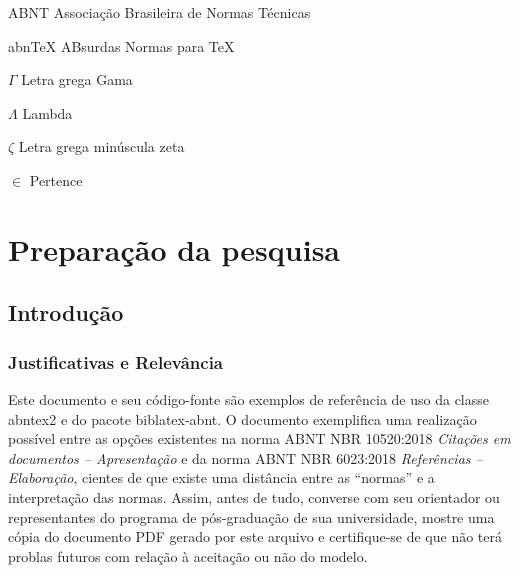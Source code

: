 \documentclass[
	12pt,				%
	openright,			%
	twoside,			%
	a4paper,			%
	english,			%
	brazil				%
	]{abntex2}
\begin{document}
\listoftables*
\cleardoublepage

\begin{siglas}
  \item[ABNT] Associação Brasileira de Normas Técnicas
  \item[abnTeX] ABsurdas Normas para TeX
\end{siglas}

\begin{simbolos}
  \item[$ \Gamma $] Letra grega Gama
  \item[$ \Lambda $] Lambda
  \item[$ \zeta $] Letra grega minúscula zeta
  \item[$ \in $] Pertence
\end{simbolos}

\tableofcontents*
\cleardoublepage
\makeatletter
{}
\makeatother



\textual
\part{Preparação da pesquisa}
%
\chapter[Introdução]{Introdução}

\section{Justificativas e Relevância}
%
Este documento e seu código-fonte são exemplos de referência de uso da classe \textsf{abntex2} e do pacote \textsf{biblatex-abnt}. O documento exemplifica uma realização possível entre as opções existentes na norma ABNT NBR 10520:2018 \emph{Citações em documentos -- Apresentação} e da norma ABNT NBR 6023:2018 \emph{Referências -- Elaboração}, cientes de que existe uma distância entre as ``normas'' e a interpretação das normas. Assim, antes de tudo, converse com seu orientador ou representantes do programa de pós-graduação de sua universidade, mostre uma cópia do documento PDF gerado por este arquivo e certifique-se de que não terá problas futuros com relação à aceitação ou não do modelo.
\end{document}
